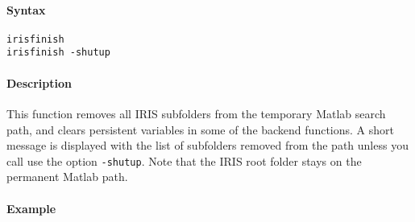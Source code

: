 


	\paragraph{Syntax}\label{syntax}

\begin{verbatim}
irisfinish
irisfinish -shutup
\end{verbatim}

\paragraph{Description}\label{description}

This function removes all IRIS subfolders from the temporary Matlab
search path, and clears persistent variables in some of the backend
functions. A short message is displayed with the list of subfolders
removed from the path unless you call use the option \texttt{-shutup}.
Note that the IRIS root folder stays on the permanent Matlab path.

\paragraph{Example}\label{example}


